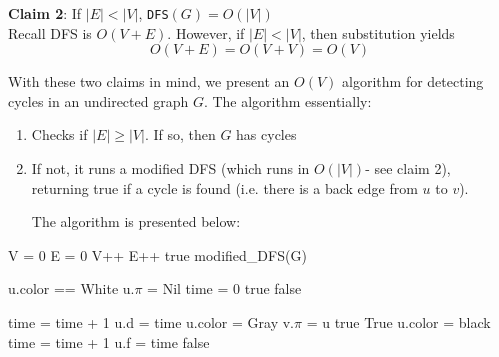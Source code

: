 \documentclass[paper=a4, fontsize=11pt]{scrartcl} %
\numberwithin{equation}{section} %
\numberwithin{figure}{section} %
\numberwithin{table}{section} %
\begin{document}
\textbf{Claim 2}: If $|E| < |V|$, \texttt{DFS}$(G) = O(|V|)$\\

Recall DFS is $O(V + E)$. However, if $|E| < |V|$, then substitution yields
\[O(V + E) = O(V + V) = O(V)\]

With these two claims in mind, we present an $O(V)$ algorithm for detecting cycles in an undirected graph $G$. The algorithm essentially:
\begin{enumerate}
\item Checks if $|E| \geq |V|$. If so, then $G$ has cycles
\item If not, it runs a modified DFS (which runs in $O(|V|)$- see claim 2), returning true if a cycle is found (i.e. there is a back edge from $u$ to $v$).

The algorithm is presented below:

\end{enumerate}

\begin{algorithmic}
	\State V = 0 
	\State E = 0 
		\State V++
	\EndFor
			\State E++
				\State \Return true
			\EndIf
		\EndFor
	\EndFor
	\State \Return modified\_DFS(G) 
\EndFunction
\end{algorithmic}

\begin{algorithmic}
		\State u.color == White
		\State u.$\pi$ = Nil
	\EndFor
	\State time = 0
				\State \Return true
			\EndIf
		\EndIf
	\EndFor
	\State \Return false 
\EndFunction
\end{algorithmic}

\begin{algorithmic}
	\State time = time + 1
	\State u.d = time
	\State u.color = Gray
			\State v.$\pi$ = u
				\State \Return true
			\EndIf
		\Else {}
			 
				\State \Return True
			\EndIf
		\EndIf
	\EndFor
	\State u.color = black
	\State time = time + 1
	\State u.f = time
	\State \Return false
\EndFunction
\end{algorithmic}
\end{document}
